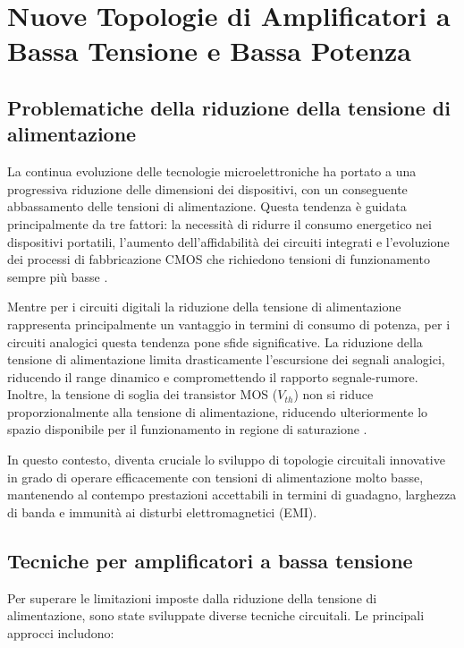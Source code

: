 \chapter{Nuove Topologie di Amplificatori a Bassa Tensione e Bassa Potenza}

\section{Problematiche della riduzione della tensione di alimentazione}

La continua evoluzione delle tecnologie microelettroniche ha portato a una progressiva riduzione delle dimensioni dei dispositivi, con un conseguente abbassamento delle tensioni di alimentazione. Questa tendenza è guidata principalmente da tre fattori: la necessità di ridurre il consumo energetico nei dispositivi portatili, l'aumento dell'affidabilità dei circuiti integrati e l'evoluzione dei processi di fabbricazione CMOS che richiedono tensioni di funzionamento sempre più basse \cite{finalprint}.

Mentre per i circuiti digitali la riduzione della tensione di alimentazione rappresenta principalmente un vantaggio in termini di consumo di potenza, per i circuiti analogici questa tendenza pone sfide significative. La riduzione della tensione di alimentazione limita drasticamente l'escursione dei segnali analogici, riducendo il range dinamico e compromettendo il rapporto segnale-rumore. Inoltre, la tensione di soglia dei transistor MOS ($V_{th}$) non si riduce proporzionalmente alla tensione di alimentazione, riducendo ulteriormente lo spazio disponibile per il funzionamento in regione di saturazione \cite{Bulk-Driven_CMOS_Amplifier_With_High_EMI_Immunity}.

In questo contesto, diventa cruciale lo sviluppo di topologie circuitali innovative in grado di operare efficacemente con tensioni di alimentazione molto basse, mantenendo al contempo prestazioni accettabili in termini di guadagno, larghezza di banda e immunità ai disturbi elettromagnetici (EMI).

\section{Tecniche per amplificatori a bassa tensione}

Per superare le limitazioni imposte dalla riduzione della tensione di alimentazione, sono state sviluppate diverse tecniche circuitali. Le principali approcci includono:

